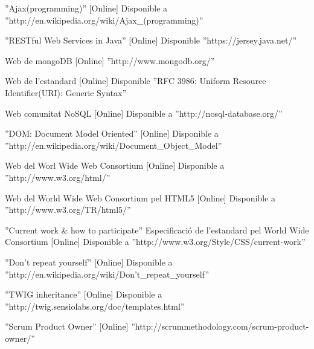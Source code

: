 \begin{thebibliography}{100}
 ''Ajax(programming)'' [Online] Disponible a ''http://en.wikipedia.org/wiki/Ajax\_(programming)''

 ''RESTful Web Services in Java'' [Online] Disponible ''https://jersey.java.net/''

 Web de mongoDB [Online] ''http://www.mongodb.org/''

 Web de l'estandard [Online] Disponible ''RFC 3986: Uniform Resource Identifier(URI): Generic Syntax''

 Web comunitat NoSQL [Online] Disponible a ''http://nosql-database.org/''

 ''DOM: Document Model Oriented'' [Online] Disponible a ''http://en.wikipedia.org/wiki/Document\_Object\_Model''

 Web del Worl Wide Web Consortium [Online] Disponible a ''http://www.w3.org/html/''

 Web del World Wide Web Consortium pel HTML5 [Online] Disponible a ''http://www.w3.org/TR/html5/''

 ''Current work & how to participate'' Especificació de l'estandard pel World Wide Consortium [Online] Disponible a ''http://www.w3.org/Style/CSS/current-work''

 ''Don't repeat yourself'' [Online] Disponible a ''http://en.wikipedia.org/wiki/Don't\_repeat\_yourself''

 ''TWIG inheritance'' [Online] Disponible a ''http://twig.sensiolabs.org/doc/templates.html''

 ''Scrum Product Owner'' [Online] ''http://scrummethodology.com/scrum-product-owner/''

\end{thebibliography}